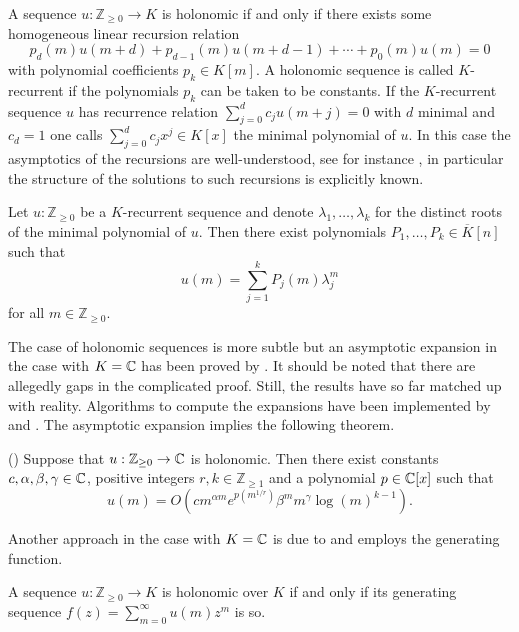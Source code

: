     A sequence $u:\mathbb{Z}_{\geq 0}\to K$ is holonomic if and only if there exists some homogeneous linear recursion relation
    $$p_d(m)u(m+d) + p_{d-1}(m)u(m+d-1) + \cdots + p_0(m)u(m) = 0 $$
    with polynomial coefficients $p_k \in K[m]$.
    A holonomic sequence is called $K$-recurrent if the polynomials $p_k$ can be taken to be constants.
    If the $K$-recurrent sequence $u$ has recurrence relation $\sum_{j=0}^d c_{j}u(m+j)= 0$ with $d$ minimal and $c_d = 1$ one calls $\sum_{j=0}^d c_jx^j\in K[x]$ the minimal polynomial of $u$.
    In this case the asymptotics of the recursions are well-understood, see for instance \cite[Chapter 2]{everest2003recurrence}, in particular the structure of the solutions to such recursions is explicitly known.
    \begin{theorem}{\cite[Theorem 1.6]{nobleAsymptotics}}\label{thm: KRecurrent}
      Let $u:\mathbb{Z}_{\geq 0}$ be a $K$-recurrent sequence and denote $\lambda_1,\ldots,\lambda_k$ for the distinct roots of the minimal polynomial of $u$.
      Then there exist polynomials $P_1,\ldots,P_k \in \overline{K}[n]$ such that
      $$u(m) = \sum_{j=1}^k P_j(m)\lambda_j^m$$
      for all $m\in \mathbb{Z}_{\geq 0}$.
    \end{theorem}
    The case of holonomic sequences is more subtle but an asymptotic expansion in the case with $K = \mathbb{C}$ has been proved by \cite{birkhoff1933analytic}.
    It should be noted that there are allegedly gaps in the complicated proof.
    Still, the results have so far matched up with reality.
    Algorithms to compute the expansions have been implemented by \cite{kauers2011mathematica} and \cite{zeilberger1990holonomic}.
    The asymptotic expansion implies the following theorem.
    \begin{theorem}(\cite{birkhoff1933analytic})\label{thm: Birkhoff}
      Suppose that $u:\mathbb{Z}_{\geq 0}\to \mathbb{C}$ is holonomic. Then there exist constants $c,\alpha, \beta, \gamma \in \mathbb{C}$, positive integers $r,k\in \mathbb{Z}_{\geq 1}$ and a polynomial $p\in \mathbb{C}[x]$ such that
      $$u(m) = O\left(cm^{\alpha m} e^{p(m^{1/r})}\beta^m m^\gamma \log(m)^{k-1}\right).$$
    \end{theorem}
    Another approach in the case with $K = \mathbb{C}$ is due to \cite{flajolet1990singularity} and employs the generating function.
    \begin{theorem}{\cite[Theorem 1.5]{stanley1980differentiably}}\label{thm: GeneratingFunction}
      A sequence $u:\mathbb{Z}_{\geq 0}\to K$ is holonomic over $K$ if and only if its generating sequence $f(z) = \sum_{m=0}^{\infty} u(m)z^m$ is so.
    \end{theorem}
